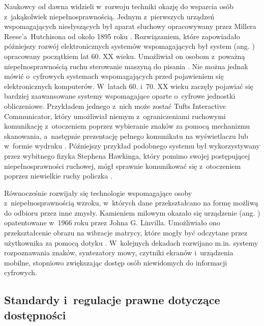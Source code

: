 Naukowcy od dawna widzieli w~rozwoju techniki okazję do wsparcia osób z~jakąkolwiek niepełnosprawnością. Jednym z~pierwszych urządzeń wspomagających niesłyszących był aparat słuchowy opracowywany przez Millera Reese'a~Hutchisona od około 1895 roku \cite{bib:hearingAidsHistory}. Rozwiązaniem, które zapowiadało późniejszy rozwój elektronicznych systemów wspomagających był system  (ang. ) opracowany początkiem lat 60. XX wieku. Umożliwiał on osobom z~poważną niepełnosprawnością ruchu sterowanie maszyną do pisania \cite{bib:possum}. Nie można jednak mówić o~cyfrowych systemach wspomagających przed pojawieniem się elektronicznych komputerów. W~latach 60. i~70. XX wieku zaczęły pojawiać się bardziej zaawansowane systemy wspomagające oparte o~cyfrowe jednostki obliczeniowe. Przykładem jednego z~nich może zostać Tufts Interactive Communicator, który umożliwiał niemym z~ograniczeniami ruchowymi komunikację z~otoczeniem poprzez wybieranie znaków za pomocą mechanizmu skanowania, a~następnie prezentację pełnego komunikatu na wyświetlaczu lub w~formie wydruku \cite{bib:augmentativeCommunication}. Późniejszy przykład podobnego systemu był wykorzystywany przez wybitnego fizyka Stephena Hawkinga, który pomimo swojej postępującej niepełnosprawności ruchowej, mógł sprawnie komunikować się z~otoczeniem poprzez niewielkie ruchy policzka \cite{bib:intel2014hawking}.

Równocześnie rozwijały się technologie wspomagające osoby z~niepełnosprawnością wzroku, w~których dane przekształcano na formę możliwą do odbioru przez inne zmysły. Kamieniem milowym okazało się urządzenie  (ang. ) opatentowane w~1966 roku przez Johna G. Linvilla. Umożliwiało ono przekształcenie obrazu na wibracje matrycy, które mogły być odczytane przez użytkownika za pomocą dotyku \cite{pat:Linvill1966ReadingAid}. W~kolejnych dekadach rozwijano m.in. systemy rozpoznawania znaków, syntezatory mowy, czytniki ekranów i~urządzenia mobilne, stopniowo zwiększając dostęp osób niewidomych do informacji cyfrowych.

\subsection{Standardy i~regulacje prawne dotyczące dostępności}

